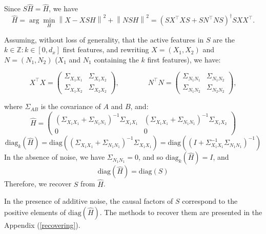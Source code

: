 \documentclass[preprint,12pt,3p]{elsarticle}
\begin{document}
Since  $S\hat H = \hat H$, we have
\begin{equation}
  \hat H = \arg \min_H  \left \| X - XSH\right\| ^2  + \left \| NSH\right \| ^2 = (S X^\top XS +SN^\top NS) ^\dagger SXX^\top.
\end{equation}

Assuming, without loss of generality, that the active features in $S$ are the $k
\in \mathbb{Z}: k \in [0, d_x]$ first features, and rewriting $X=(X_1,X_2)$ and
$N=(N_1,N_2)$ ($X_1$ and $N_1$ containing the $k$ first features), we have:

\begin{equation}
  X^\top X = \left(\begin{array}{lccl}\Sigma_{X_1 X_1} & \Sigma_{X_1 X_2} \\ \Sigma_{X_1 X_2} & \Sigma_{X_2 X_2}\end{array}\right),\qquad\qquad N^\top N = \left(\begin{array}{lccl}\Sigma_{N_1 N_1} & \Sigma_{N_1 N_2} \\ \Sigma_{N_1 N_2} & \Sigma_{N_2 N_2}\end{array}\right),
\end{equation}

where $\Sigma_{A B}$ is the covariance of $A$ and $B$, and:
\begin{equation}
  \hat H = \left(\begin{array}{cc}(\Sigma_{X_1 X_1}+\Sigma_{N_1 N_1})^{-1}\Sigma_{X_1 X_1} & (\Sigma_{X_1 X_1}+\Sigma_{N_1 N_1})^{-1}\Sigma_{X_1 X_2} \\0 & 0\end{array}\right)
\end{equation}
\begin{equation}
  \text{diag}_k (\hat H) = \text{diag}((\Sigma_{X_1 X_1}+\Sigma_{N_1 N_1})^{-1}\Sigma_{X_1 X_1}) = \text{diag}((I+\Sigma_{X_1 X_1}^{-1}\Sigma_{N_1 N_1})^{-1})
  \label{eq:diagk}
\end{equation}
%
%
In the absence of noise, we have $\Sigma_{N_1 N_1}=0$, and so
$\text{diag}_k(\hat H)=I$, and $$\text{diag}(\hat H) = \text{diag}(S)$$
Therefore, we recover $S$ from $\hat H$.


In the presence of additive noise, the causal factors of $S$ correspond to the positive
elements of $\text{diag}(\hat H)$. The methods to recover them are presented in
the Appendix (\ref{recovering}).
\end{document}
